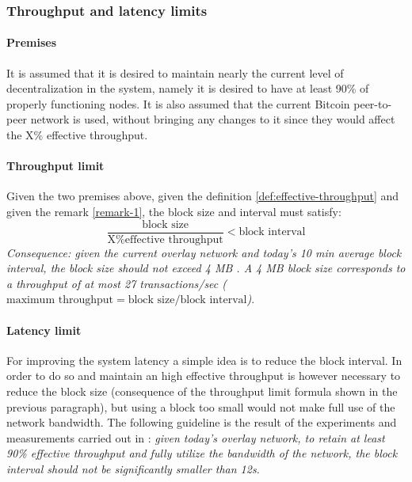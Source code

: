
\subsubsection{Throughput and latency limits}

\paragraph{Premises} It is assumed that it is desired to maintain nearly the
current level of decentralization in the system, namely it is desired to have at
least 90\% of properly functioning nodes. It is also assumed that the current
Bitcoin peer-to-peer network is used, without bringing any changes to it since
they would affect the X\% effective throughput.

\paragraph{Throughput limit} Given the two premises above, given the definition
\ref{def:effective-throughput} and given the remark \ref{remark-1}, the block size and
interval must satisfy:
\[ \frac{\text{block size}}{\text{X\% effective throughput}} < \text{block interval} \]
\emph{Consequence: given the current overlay network and today’s 10 min average
block interval, the block size should not exceed 4 MB \cite{croman-scaling-blockchain}.
A 4 MB block size corresponds to a throughput of at most 27 transactions/sec
($\text{maximum throughput} = \text{block size} / \text{block interval}$)}.


\paragraph{Latency limit} For improving the system latency a simple idea is to
reduce the block interval. In order to do so and maintain an high effective
throughput is however necessary to reduce the block size (consequence of the
throughput limit formula shown in the previous paragraph), but using a block too
small would not make full use of the network bandwidth. The following guideline
is the result of the experiments and measurements carried out in
\cite{croman-scaling-blockchain}:  \emph{given today’s overlay network, to retain at
least 90\% effective throughput and fully utilize the bandwidth of the network,
the block interval should not be significantly smaller than 12s.}





